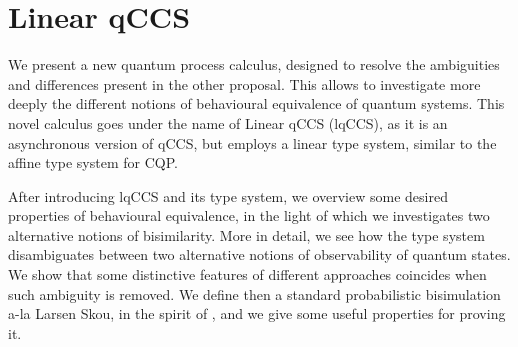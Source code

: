 \documentclass[10pt,a4paper, titlepage]{report}
\newcommand{\note}[1]{{\color{red} #1}}
\theoremstyle{remark}
\begin{document}
%
%
%
%
%
%



\chapter{Linear qCCS}\label{chapter4}

We present a new quantum process calculus, designed to resolve the ambiguities and differences present in the other proposal. This allows to investigate more deeply the different notions of behavioural equivalence of quantum systems. 
This novel calculus goes under the name of Linear qCCS (lqCCS), as it is an asynchronous version of qCCS, but employs a linear type system, similar to the affine type system for CQP.

After introducing lqCCS and its type system, we overview some desired properties of behavioural equivalence, in the light of which we investigates two alternative notions of bisimilarity. More in detail, we see how the type system disambiguates between two alternative notions of observability of quantum states. We show that some distinctive features of different approaches coincides when such ambiguity is removed. We define then a standard probabilistic bisimulation a-la Larsen Skou, in the spirit of \cite{dengOpenBisimulationQuantum2012}, and we give some useful properties for proving it. 
\end{document}
